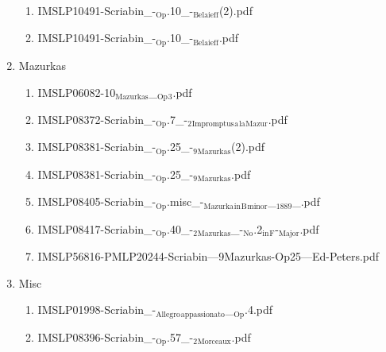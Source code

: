 \documentclass[11pt]{article}
\begin{document}
\begin{enumerate}
\begin{enumerate}
\item IMSLP10491-Scriabin\_-$_{\text{Op}}$.10\_-$_{\text{Belaieff}}$(2).pdf
\label{sec-1-1-1-1-44-63-5-6}

\item IMSLP10491-Scriabin\_-$_{\text{Op}}$.10\_-$_{\text{Belaieff}}$.pdf
\label{sec-1-1-1-1-44-63-5-7}
\end{enumerate}

\item Mazurkas
\label{sec-1-1-1-1-44-63-6}
\begin{enumerate}
\item IMSLP06082-10$_{\text{Mazurkas}}$\_$_{\text{Op}}$$_{\text{3}}$.pdf
\label{sec-1-1-1-1-44-63-6-1}

\item IMSLP08372-Scriabin\_-$_{\text{Op}}$.7\_-$_{\text{2}}$$_{\text{Impromptus}}$$_{\text{a}}$$_{\text{la}}$$_{\text{Mazur}}$.pdf
\label{sec-1-1-1-1-44-63-6-2}

\item IMSLP08381-Scriabin\_-$_{\text{Op}}$.25\_-$_{\text{9}}$$_{\text{Mazurkas}}$(2).pdf
\label{sec-1-1-1-1-44-63-6-3}

\item IMSLP08381-Scriabin\_-$_{\text{Op}}$.25\_-$_{\text{9}}$$_{\text{Mazurkas}}$.pdf
\label{sec-1-1-1-1-44-63-6-4}

\item IMSLP08405-Scriabin\_-$_{\text{Op}}$.misc\_-$_{\text{Mazurka}}$$_{\text{in}}$$_{\text{B}}$$_{\text{minor}}$\_$_{\text{1889}}$\_.pdf
\label{sec-1-1-1-1-44-63-6-5}

\item IMSLP08417-Scriabin\_-$_{\text{Op}}$.40\_-$_{\text{2}}$$_{\text{Mazurkas}}$\_-$_{\text{No}}$.2$_{\text{in}}$$_{\text{F}}$-$_{\text{Major}}$.pdf
\label{sec-1-1-1-1-44-63-6-6}

\item IMSLP56816-PMLP20244-Scriabin---9Mazurkas-Op25---Ed-Peters.pdf
\label{sec-1-1-1-1-44-63-6-7}
\end{enumerate}

\item Misc
\label{sec-1-1-1-1-44-63-7}
\begin{enumerate}
\item IMSLP01998-Scriabin\_-$_{\text{Allegro}}$$_{\text{appassionato}}$\_$_{\text{Op}}$.4.pdf
\label{sec-1-1-1-1-44-63-7-1}

\item IMSLP08396-Scriabin\_-$_{\text{Op}}$.57\_-$_{\text{2}}$$_{\text{Morceaux}}$.pdf
\label{sec-1-1-1-1-44-63-7-2}


\end{enumerate}
\end{enumerate}
\end{document}
